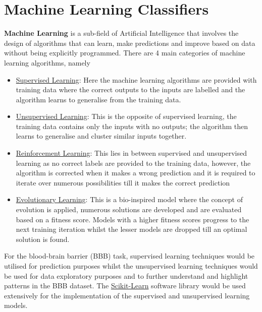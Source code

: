 \documentclass[a4paper,12pt]{report}
\begin{document}
\chapter{Machine Learning Classifiers} \label{chapter:ml_classifier}
	\textbf{Machine Learning} is a sub-field of Artificial Intelligence that involves the design of algorithms that can learn, make predictions and improve based on data without being explicitly programmed. There are 4 main categories of machine learning algorithms, namely \cite{StephenM2014}
		\begin{itemize}
			\item \underline{Supervised Learning}: Here the machine learning algorithms are provided with training data where the correct outputs to the inputs are labelled and the algorithm learns to generalise from the training data.
			\item \underline{Unsupervised Learning}: This is the opposite of supervised learning, the training data contains only the inputs with no outputs; the algorithm then learns to generalise and cluster similar inputs together.
			\item \underline{Reinforcement Learning}: This lies in between supervised and unsupervised learning as no correct labels are provided to the training data, however, the algorithm is corrected when it makes a wrong prediction and it is required to iterate over numerous possibilities till it makes the correct prediction
			\item \underline{Evolutionary Learning}: This is a bio-inspired model where the concept of evolution is applied, numerous solutions are developed and are evaluated based on a fitness score. Models with a higher fitness scores progress to the next training iteration whilst the lesser models are dropped till an optimal solution is found.
		\end{itemize}
	For the blood-brain barrier (BBB) task, supervised learning techniques would be utilised for prediction purposes whilst the unsupervised learning techniques would be used for data exploratory purposes and to further understand and highlight patterns in the BBB dataset. The \href{http://scikit-learn.org/stable/}{Scikit-Learn} software library would be used extensively for the implementation of the supervised and unsupervised learning models.
	
\end{document}
